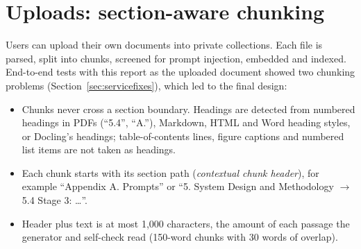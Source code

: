 \documentclass[11pt,a4paper]{report}
\begin{document}
\section{Uploads: section-aware chunking}
Users can upload their own documents into private collections. Each file is parsed, split into chunks, screened for prompt injection, embedded and indexed. End-to-end tests with this report as the uploaded document showed two chunking problems (Section~\ref{sec:servicefixes}), which led to the final design:
\begin{itemize}
\item Chunks never cross a section boundary. Headings are detected from numbered headings in PDFs (``5.4'', ``A.''), Markdown, HTML and Word heading styles, or Docling's headings; table-of-contents lines, figure captions and numbered list items are not taken as headings.
\item Each chunk starts with its section path (\emph{contextual chunk header}), for example ``Appendix A. Prompts'' or ``5. System Design and Methodology $\rightarrow$ 5.4 Stage 3: \ldots''.
\item Header plus text is at most 1{,}000 characters, the amount of each passage the generator and self-check read (150-word chunks with 30 words of overlap).
\end{itemize}
\end{document}
